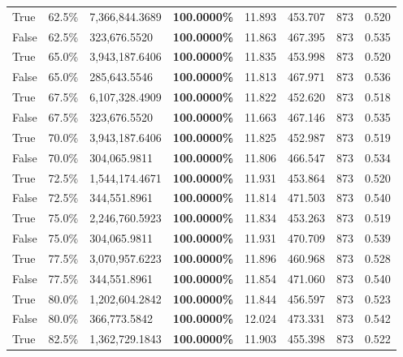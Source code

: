 \begin{table}[H]
{\begin{tabular}{lllrllll}
\cline{1-8}
True & 62.5\% & 7,366,844.3689 & \bfseries \color{red} 100.0000\% & 11.893 & 453.707 & 873 & 0.520 \\
\cline{1-8}
False & 62.5\% & 323,676.5520 & \bfseries \color{red} 100.0000\% & 11.863 & 467.395 & 873 & 0.535 \\
\cline{1-8}
True & 65.0\% & 3,943,187.6406 & \bfseries \color{red} 100.0000\% & 11.835 & 453.998 & 873 & 0.520 \\
\cline{1-8}
False & 65.0\% & 285,643.5546 & \bfseries \color{red} 100.0000\% & 11.813 & 467.971 & 873 & 0.536 \\
\cline{1-8}
True & 67.5\% & 6,107,328.4909 & \bfseries \color{red} 100.0000\% & 11.822 & 452.620 & 873 & 0.518 \\
\cline{1-8}
False & 67.5\% & 323,676.5520 & \bfseries \color{red} 100.0000\% & 11.663 & 467.146 & 873 & 0.535 \\
\cline{1-8}
True & 70.0\% & 3,943,187.6406 & \bfseries \color{red} 100.0000\% & 11.825 & 452.987 & 873 & 0.519 \\
\cline{1-8}
False & 70.0\% & 304,065.9811 & \bfseries \color{red} 100.0000\% & 11.806 & 466.547 & 873 & 0.534 \\
\cline{1-8}
True & 72.5\% & 1,544,174.4671 & \bfseries \color{red} 100.0000\% & 11.931 & 453.864 & 873 & 0.520 \\
\cline{1-8}
False & 72.5\% & 344,551.8961 & \bfseries \color{red} 100.0000\% & 11.814 & 471.503 & 873 & 0.540 \\
\cline{1-8}
True & 75.0\% & 2,246,760.5923 & \bfseries \color{red} 100.0000\% & 11.834 & 453.263 & 873 & 0.519 \\
\cline{1-8}
False & 75.0\% & 304,065.9811 & \bfseries \color{red} 100.0000\% & 11.931 & 470.709 & 873 & 0.539 \\
\cline{1-8}
True & 77.5\% & 3,070,957.6223 & \bfseries \color{red} 100.0000\% & 11.896 & 460.968 & 873 & 0.528 \\
\cline{1-8}
False & 77.5\% & 344,551.8961 & \bfseries \color{red} 100.0000\% & 11.854 & 471.060 & 873 & 0.540 \\
\cline{1-8}
True & 80.0\% & 1,202,604.2842 & \bfseries \color{red} 100.0000\% & 11.844 & 456.597 & 873 & 0.523 \\
\cline{1-8}
False & 80.0\% & 366,773.5842 & \bfseries \color{red} 100.0000\% & 12.024 & 473.331 & 873 & 0.542 \\
\cline{1-8}
True & 82.5\% & 1,362,729.1843 & \bfseries \color{red} 100.0000\% & 11.903 & 455.398 & 873 & 0.522 \\

\end{tabular}}
\end{table}
